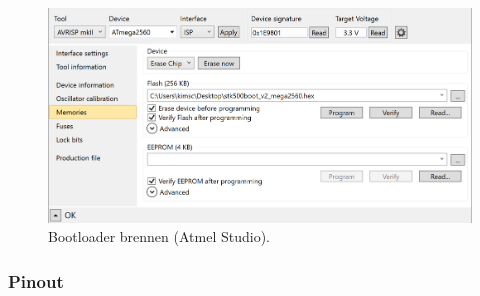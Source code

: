 

\begin{figure}[H]
	\centering
	\includegraphics[width=\textwidth]{graphics/AtmelStudio_Program_Bootloader}
	\caption{Bootloader brennen (Atmel Studio).}
	\label{fig:AtmelStudio_Program_Bootloader}
\end{figure}

%
%

\subsubsection{Pinout}\label{Appendix:AVR_Pinout}

